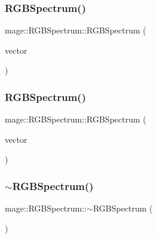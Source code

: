 \hypertarget{structmage_1_1_r_g_b_spectrum_af2837c778d5aa9b065f5b8b0a039fa02}{}\label{structmage_1_1_r_g_b_spectrum_af2837c778d5aa9b065f5b8b0a039fa02} 
\subsubsection{\texorpdfstring{R\+G\+B\+Spectrum()}{RGBSpectrum()}\hspace{0.1cm}{\footnotesize\ttfamily [7/8]}}
{\footnotesize\ttfamily mage\+::\+R\+G\+B\+Spectrum\+::\+R\+G\+B\+Spectrum (\begin{DoxyParamCaption}\item[{const X\+M\+F\+L\+O\+A\+T3 \&}]{vector }\end{DoxyParamCaption})\hspace{0.3cm}{\ttfamily [explicit]}}

\hypertarget{structmage_1_1_r_g_b_spectrum_aa97e6d34ba6bd45c071b458ee7f69191}{}\label{structmage_1_1_r_g_b_spectrum_aa97e6d34ba6bd45c071b458ee7f69191} 
\subsubsection{\texorpdfstring{R\+G\+B\+Spectrum()}{RGBSpectrum()}\hspace{0.1cm}{\footnotesize\ttfamily [8/8]}}
{\footnotesize\ttfamily mage\+::\+R\+G\+B\+Spectrum\+::\+R\+G\+B\+Spectrum (\begin{DoxyParamCaption}\item[{X\+M\+F\+L\+O\+A\+T3 \&\&}]{vector }\end{DoxyParamCaption})\hspace{0.3cm}{\ttfamily [explicit]}}

\hypertarget{structmage_1_1_r_g_b_spectrum_a7c18a007349953b1e4711a4856680b02}{}\label{structmage_1_1_r_g_b_spectrum_a7c18a007349953b1e4711a4856680b02} 
\subsubsection{\texorpdfstring{$\sim$\+R\+G\+B\+Spectrum()}{~RGBSpectrum()}}
{\footnotesize\ttfamily mage\+::\+R\+G\+B\+Spectrum\+::$\sim$\+R\+G\+B\+Spectrum (\begin{DoxyParamCaption}{ }\end{DoxyParamCaption})\hspace{0.3cm}{\ttfamily [default]}}




